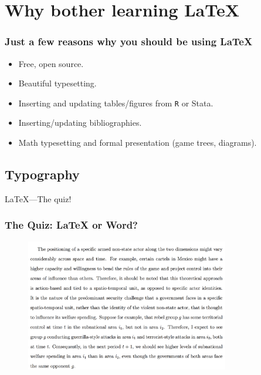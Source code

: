 \documentclass{beamer} %
\begin{document}
\section{Why bother learning {\LaTeX}}\label{why}

\begin{frame}
\frametitle{Just a few reasons why you should be using \LaTeX}
\begin{itemize}
\item<1-> Free, open source.
\item<2-> Beautiful typesetting.
\item<3-> Inserting and updating tables/figures from \texttt{R} or Stata.
\item<4-> Inserting/updating bibliographies.
\item<5-> Math typesetting and formal presentation (game trees, diagrams). 
\end{itemize}
\end{frame}

\subsection{Typography}


\begin{frame}
\Huge\centering
\LaTeX---The quiz!
\end{frame}
 
\begin{frame}
\frametitle{The Quiz: {\LaTeX} or Word?}
\begin{figure}[htbp]
\begin{center}
\includegraphics[width = 3.5in]{latex1.pdf}
\end{center}
\end{figure}
\end{frame}
\end{document}

